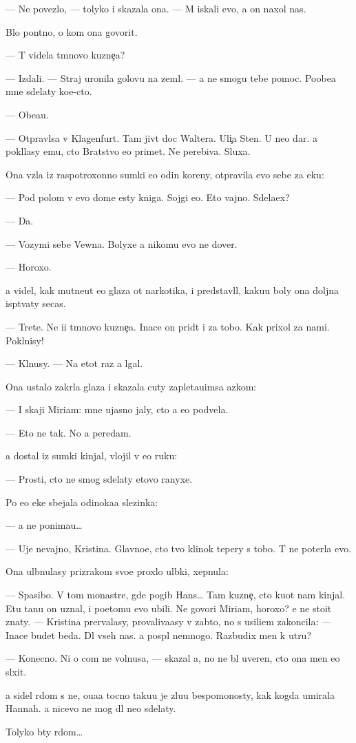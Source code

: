 \documentclass[10pt]{book}
\begin{document}
— Ne povezlo, — tolyko i skazala ona. — M{\yi} iskali {\y}evo, a on naxol nas.

B{\yi}lo pon{\ia}tno, o kom ona govorit.

— T{\yi} videla t{\e}mnovo kuzne{\c}a?

— Izdali. — Straj uronila golovu na zeml{\io}. — {\Y}a ne smogu tebe pomoc. Poobe{\x}a{\y} mne sdelaty ko{\y}e-cto.

— Obe{\x}a{\y}u.

— Otpravl{\ia}{\y}sa v Klagenfurt. Tam jiv{\e}t doc Waltera. Uli{\c}a Sten{\yi}. U ne{\y}o dar. {\Y}a pokl{\ia}lasy {\y}emu, cto Bratstvo {\y}e{\y}o primet. Ne perebiva{\y}. Sluxa{\y}.

Ona vz{\ia}la iz raspotroxonno{\y} sumki {\y}e{\x}o odin koreny, otpravila {\y}evo sebe za {\x}eku:

— Pod polom v {\y}evo dome {\y}esty kniga. Sojgi {\y}e{\y}o. Eto vajno. Sdela{\y}ex?

— Da.

— Vozymi sebe Vewna. Bolyxe {\y}a nikomu {\y}evo ne dover{\io}.

— Horoxo.

{\Y}a videl, kak mutne{\y}ut {\y}e{\y}o glaza ot narkotika, i predstavl{\ia}l, kaku{\y}u boly ona doljna isp{\yi}t{\yi}vaty se{\y}cas.

— Tret{\y}e. Ne i{\x}i t{\e}mnovo kuzne{\c}a. Inace on prid{\e}t i za tobo{\y}. Kak prixol za nami. Pokl{\ia}nisy!

— Kl{\ia}nusy. — Na etot raz {\y}a lgal.

Ona ustalo zakr{\yi}la glaza i skazala cuty zapleta{\y}u{\x}imsa {\y}az{\yi}kom:

— I skaji Mi\-ri\-am: mne ujasno jaly, cto {\y}a {\y}e{\y}o podvela.

— Eto ne tak. No {\y}a peredam.

{\Y}a dostal iz sumki kinjal, vlojil v {\y}e{\y}o ruku:

— Prosti, cto ne smog sdelaty etovo ranyxe.

Po {\y}e{\y}o {\x}eke sbejala odinoka{\y}a slezinka:

— {\Y}a ne ponima{\y}u…

— Uje ne\-vaj\-no, Kristina. Glavno{\y}e, cto tvo{\y} klinok tepery s tobo{\y}. T{\yi} ne poter{\ia}la {\y}evo.

Ona ul{\yi}bnulasy prizrakom svo{\y}e{\y} proxlo{\y} ul{\yi}bki, xepnula:

— Spasibo. V tom monast{\yi}re, gde pogib Hans… Tam kuzne{\c}, cto ku{\y}ot nam kinjal{\yi}. Etu ta{\y}nu on uznal, i poetomu {\y}evo ubili. Ne govori Mi\-ri\-am, horoxo? {\Y}e{\y} ne stoit znaty. — Kristina prervalasy, provaliva{\y}asy v zab{\yi}t{\y}o, no s usili{\y}em zakoncila: — Inace budet beda. Dl{\ia} vseh nas. {\Y}a pospl{\io} nemnogo. Razbudix men{\ia} k utru?

— Konecno. Ni o com ne volnu{\y}sa, — skazal {\y}a, no ne b{\yi}l uveren, cto ona men{\ia} {\y}e{\x}o sl{\yi}xit.

{\Y}a sidel r{\ia}dom s ne{\y}, o{\x}u{\x}a{\y}a tocno taku{\y}u je zlu{\y}u bespomo{\x}nosty, kak kogda umirala Hannah. {\Y}a nicevo ne mog dl{\ia} ne{\y}o sdelaty.

Tolyko b{\yi}ty r{\ia}dom…
\end{document}
